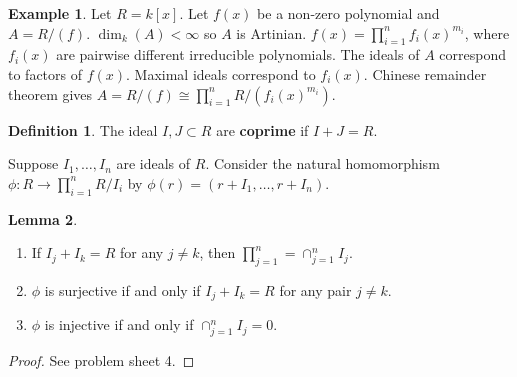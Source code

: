 \documentclass{article}
\newcommand{\rb}[1]{\left( #1 \right)}
\renewcommand{\sb}[1]{\left[ #1 \right]}
\theoremstyle{definition}\newtheorem{definition}{Definition}[section]
\theoremstyle{definition}\newtheorem{remark}[definition]{Remark}
\theoremstyle{definition}\newtheorem*{example}{Example}
\theoremstyle{definition}\newtheorem*{note}{Note}
\newtheorem{lemma}[definition]{Lemma}
\begin{document}
\begin{example}
Let $ R = k\sb{x} $. Let $ f\rb{x} $ be a non-zero polynomial and $ A = R / \rb{f} $. $ \dim_k\rb{A} < \infty $ so $ A $ is Artinian. $ f\rb{x} = \prod_{i = 1}^n f_i\rb{x}^{m_i} $, where $ f_i\rb{x} $ are pairwise different irreducible polynomials. The ideals of $ A $ correspond to factors of $ f\rb{x} $. Maximal ideals correspond to $ f_i\rb{x} $. Chinese remainder theorem gives $ A = R / \rb{f} \cong \prod_{i = 1}^n R / \rb{f_i\rb{x}^{m_i}} $.
\end{example}

\begin{definition}
The ideal $ I, J \subset R $ are \textbf{coprime} if $ I + J = R $.
\end{definition}

Suppose $ I_1, \dots, I_n $ are ideals of $ R $. Consider the natural homomorphism $ \phi : R \to \prod_{i = 1}^n R / I_i $ by $ \phi\rb{r} = \rb{r + I_1, \dots, r + I_n} $.

\begin{lemma}
\label{lem:12.17}
\hfill
\begin{enumerate}
\item If $ I_j + I_k = R $ for any $ j \ne k $, then $ \prod_{j = 1}^n = \cap_{j = 1}^n I_j $.
\item $ \phi $ is surjective if and only if $ I_j + I_k = R $ for any pair $ j \ne k $.
\item $ \phi $ is injective if and only if $ \cap_{j = 1}^n I_j = 0 $.
\end{enumerate}
\end{lemma}

\begin{proof}
See problem sheet 4.
\end{proof}
\end{document}
